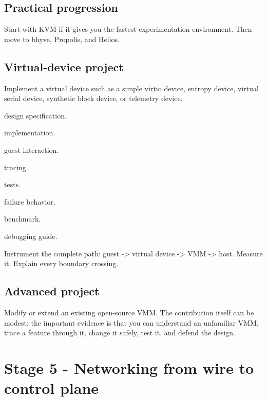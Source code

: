 \documentclass[11pt,letterpaper]{article}
\begin{document}
\subsection*{Practical progression}

Start with KVM if it gives you the fastest experimentation environment. Then move to bhyve, Propolis, and Helios.

\subsection*{Virtual-device project}

Implement a virtual device such as a simple virtio device, entropy device, virtual serial device, synthetic block device, or telemetry device.

\begin{topics}

\item design specification.

\item implementation.

\item guest interaction.

\item tracing.

\item tests.

\item failure behavior.

\item benchmark.

\item debugging guide.

\end{topics}

Instrument the complete path: guest -> virtual device -> VMM -> host. Measure it. Explain every boundary crossing.

\subsection*{Advanced project}

Modify or extend an existing open-source VMM. The contribution itself can be modest; the important evidence is that you can understand an unfamiliar VMM, trace a feature through it, change it safely, test it, and defend the design.

\section{Stage 5 - Networking from wire to control plane}\label{sec:9}
\end{document}
